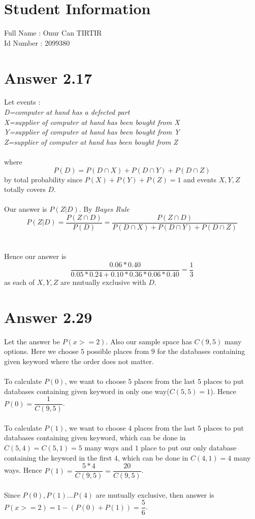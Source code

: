 \documentclass[12pt]{article}
\begin{document}
\section*{Student Information } 
Full Name :  Onur Can TIRTIR\\
Id Number :  2099380\\

\section*{Answer 2.17}
Let events :\\
 \textit{D=computer at hand has a defected part} \\
 \textit{X=supplier of computer at hand has been bought from X} \\
 \textit{Y=supplier of computer at hand has been bought from Y} \\
 \textit{Z=supplier of computer at hand has been bought from Z} \\ \\
where $$P(D)=P(D\cap X)+P(D\cap Y)+P(D\cap Z)$$ by total probability since $P(X)+P(Y)+P(Z)=1$ and events $X, Y, Z$ totally covers $D$.\\ \\
Our answer is $P(Z|D)$. By \textit{Bayes Rule} $$P(Z|D)=\dfrac{P(Z\cap D)}{P(D)}=\dfrac{P(Z\cap D)}{P(D\cap X)+P(D\cap Y)+P(D\cap Z)}$$\\ \\
Hence our answer is $$\dfrac{0.06*0.40}{0.05*0.24+0.10*0.36*0.06*0.40}=\dfrac{1}{3}$$ as each of $X, Y, Z$ are mutually exclusive with $D$.

\section*{Answer 2.29}

Let the answer be $P(x>=2)$. Also our sample space has $C(9, 5)$ many options. Here we choose $5$ possible places from $9$ for the databases containing given keyword where the order does not matter.\\ \\
To calculate $P(0)$, we want to choose $5$ places from the last $5$ places to put databases containing given keyword in only one way($C(5, 5)=1$). Hence $P(0)=\dfrac{1}{C(9, 5)}$.\\ \\
To calculate $P(1)$, we want to choose $4$ places from the last $5$ places to put databases containing given keyword, which can be done in $C(5, 4)=C(5, 1)=5$ many ways and $1$ place to put our only database containing the keyword in the first $4$, which can be done in $C(4, 1)=4$ many ways. Hence $P(1)= \dfrac{5*4}{C(9, 5)}= \dfrac{20}{C(9, 5)}$.\\ \\ 
Since $P(0),P(1) \dots P(4)$ are mutually exclusive, then answer is $P(x>=2)=1-(P(0)+P(1))=\dfrac{5}{6}$.
\end{document}
